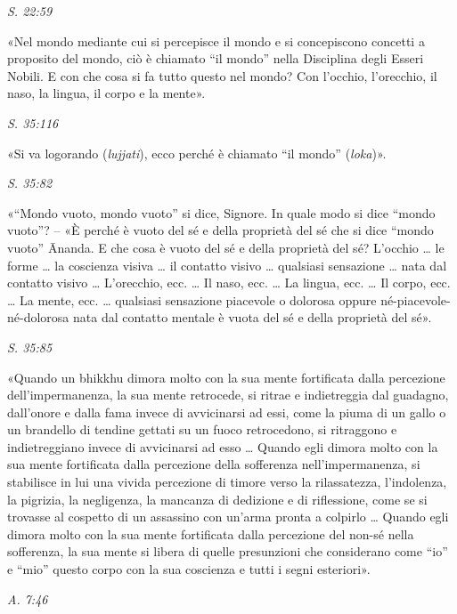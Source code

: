 \emph{S. 22:59}


«Nel mondo mediante cui si percepisce il mondo e si concepiscono
concetti a proposito del mondo, ciò è chiamato “il mondo” nella
Disciplina degli Esseri Nobili. E con che cosa si fa tutto questo nel
mondo? Con l’occhio, l’orecchio, il naso, la lingua, il corpo e la
mente».


\emph{S. 35:116}


«Si va logorando (\emph{lujjati}), ecco perché è chiamato “il mondo”
(\emph{loka})».


\emph{S. 35:82}


«“Mondo vuoto, mondo vuoto” si dice, Signore. In quale modo si dice
“mondo vuoto”? – «È perché è vuoto del sé e della proprietà del sé che
si dice “mondo vuoto” Ānanda. E che cosa è vuoto del sé e della
proprietà del sé? L’occhio … le forme … la coscienza visiva … il
contatto visivo … qualsiasi sensazione … nata dal contatto visivo …
L’orecchio, ecc. … Il naso, ecc. … La lingua, ecc. … Il corpo, ecc. … La
mente, ecc. … qualsiasi sensazione piacevole o dolorosa oppure
né-piacevole-né-dolorosa nata dal contatto mentale è vuota del sé e
della proprietà del sé».


\emph{S. 35:85}


«Quando un bhikkhu dimora molto con la sua mente fortificata dalla
percezione dell’impermanenza, la sua mente retrocede, si ritrae e
indietreggia dal guadagno, dall’onore e dalla fama invece di avvicinarsi
ad essi, come la piuma di un gallo o un brandello di tendine gettati su
un fuoco retrocedono, si ritraggono e indietreggiano invece di
avvicinarsi ad esso … Quando egli dimora molto con la sua mente
fortificata dalla percezione della sofferenza nell’impermanenza, si
stabilisce in lui una vivida percezione di timore verso la rilassatezza,
l’indolenza, la pigrizia, la negligenza, la mancanza di dedizione e di
riflessione, come se si trovasse al cospetto di un assassino con un’arma
pronta a colpirlo … Quando egli dimora molto con la sua mente
fortificata dalla percezione del non-sé nella sofferenza, la sua mente
si libera di quelle presunzioni che considerano come “io” e “mio” questo
corpo con la sua coscienza e tutti i segni esteriori».


\emph{A. 7:46}


